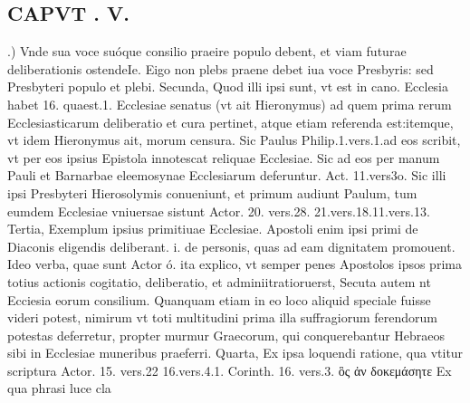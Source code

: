 \documentclass{article}
\begin{document}
\begin{pages}
\section*{CAPVT . V. }
\marginpar{[ p.353 ]}.) Vnde sua voce suóque consilio praeire populo debent, et viam futurae deliberationis ostendeIe. Eigo non plebs praene debet iua voce Presbyris: sed Presbyteri populo et plebi.  \pend\pstart Secunda, Quod illi ipsi sunt, vt est in cano. Ecclesia habet 16. quaest.1. Ecclesiae senatus (vt ait Hieronymus) ad quem prima rerum Ecclesiasticarum deliberatio et cura pertinet, atque etiam referenda est:itemque, vt idem Hieronymus ait, morum censura. Sic Paulus Philip.1.vers.1.ad eos scribit, vt per eos ipsius Epistola innotescat reliquae Ecclesiae. Sic ad eos per manum Pauli et Barnarbae eleemosynae Ecclesiarum deferuntur. Act. 11.vers3o. Sic illi ipsi Presbyteri Hierosolymis conueniunt, et primum audiunt Paulum, tum eumdem Ecclesiae vniuersae sistunt Actor. 20. vers.28. 21.vers.18.11.vers.13.  \pend\pstart Tertia, Exemplum ipsius primitiuae Ecclesiae. Apostoli enim ipsi primi de Diaconis eligendis deliberant. i. de personis, quas ad eam dignitatem promouent. Ideo verba, quae sunt Actor ó. ita explico, vt semper penes Apostolos ipsos prima totius actionis cogitatio, deliberatio, et adminiitratioruerst, Secuta autem nt Ecciesia eorum consilium. Quanquam etiam in eo loco aliquid speciale fuisse videri potest, nimirum vt toti multitudini prima illa suffragiorum ferendorum potestas deferretur, propter murmur Graecorum, qui conquerebantur Hebraeos sibi in Ecclesiae muneribus praeferri.  \pend\pstart Quarta, Ex ipsa loquendi ratione, qua vtitur scriptura Actor. 15. vers.22 16.vers.4.1. Corinth. 16. vers.3. ὃς ἀν δοκεμάσητε Ex qua phrasi luce cla\pend

\end{pages}
\end{document}
